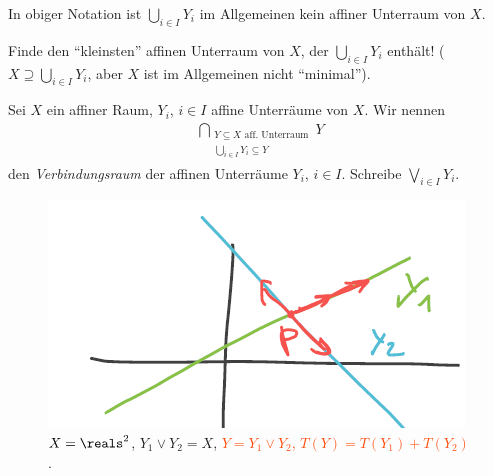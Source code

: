 \begin{bemerkung*}
    In obiger Notation ist \( \bigcup_{i\in I}Y_i \) im Allgemeinen kein affiner Unterraum von \( X \).
\end{bemerkung*}
\begin{frage*}
    Finde den \enquote{kleinsten} affinen Unterraum von \( X \), der \( \bigcup_{i\in I}Y_i \) enthält! (\zb \( X\supseteq \bigcup_{i\in I} Y_i\), aber \( X \) ist im Allgemeinen nicht \enquote{minimal}).
\end{frage*}
\begin{definition*}
    Sei \( X \) ein affiner Raum, \( Y_i \), \( i\in I \) affine Unterräume von \( X \). Wir nennen
    \begin{align*}
        \bigcap_{\substack{Y\subseteq X \text{ aff.\ Unterraum}\\\bigcup_{i\in I}Y_i\subseteq Y}}Y
    \end{align*}
    den \emph{Verbindungsraum} der affinen Unterräume \( Y_i \), \( i\in I \). Schreibe \( \bigvee_{i\in I}Y_i \).
\end{definition*}
\begin{beispiel*}
    \begin{figure}[H]
        \centering
        \includegraphics[width=0.5\linewidth]{figures/verbindungsraum_zwei_geraden}
        \caption*{\( X=\reals^2 \), \( Y_1\vee Y_2=X \), \textcolor{OrangeRed}{\( Y=Y_1\vee Y_2 \), \( T(Y)=T(Y_1)+T(Y_2) \)}.}
        \label{fig:verbindungsraum_zwei_geraden}
    \end{figure}
    
\end{beispiel*}

